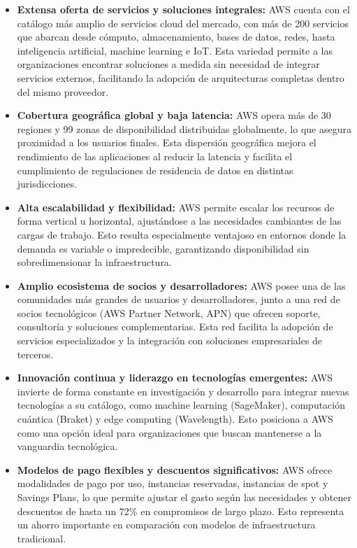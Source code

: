 {                \begin{itemize}
                    \item \textbf{Extensa oferta de servicios y soluciones integrales:} AWS cuenta con el catálogo más amplio de servicios cloud del mercado, con más de 200 servicios que abarcan desde cómputo, almacenamiento, bases de datos, redes, hasta inteligencia artificial, machine learning e IoT. Esta variedad permite a las organizaciones encontrar soluciones a medida sin necesidad de integrar servicios externos, facilitando la adopción de arquitecturas completas dentro del mismo proveedor.
                    \item \textbf{Cobertura geográfica global y baja latencia:} AWS opera más de 30 regiones y 99 zonas de disponibilidad distribuidas globalmente, lo que asegura proximidad a los usuarios finales. Esta dispersión geográfica mejora el rendimiento de las aplicaciones al reducir la latencia y facilita el cumplimiento de regulaciones de residencia de datos en distintas jurisdicciones.
                    \item \textbf{Alta escalabilidad y flexibilidad:} AWS permite escalar los recursos de forma vertical u horizontal, ajustándose a las necesidades cambiantes de las cargas de trabajo. Esto resulta especialmente ventajoso en entornos donde la demanda es variable o impredecible, garantizando disponibilidad sin sobredimensionar la infraestructura.
                    \item \textbf{Amplio ecosistema de socios y desarrolladores:} AWS posee una de las comunidades más grandes de usuarios y desarrolladores, junto a una red de socios tecnológicos (AWS Partner Network, APN) que ofrecen soporte, consultoría y soluciones complementarias. Esta red facilita la adopción de servicios especializados y la integración con soluciones empresariales de terceros.
                    \item \textbf{Innovación continua y liderazgo en tecnologías emergentes:} AWS invierte de forma constante en investigación y desarrollo para integrar nuevas tecnologías a su catálogo, como machine learning (SageMaker), computación cuántica (Braket) y edge computing (Wavelength). Esto posiciona a AWS como una opción ideal para organizaciones que buscan mantenerse a la vanguardia tecnológica.
                    \item \textbf{Modelos de pago flexibles y descuentos significativos:} AWS ofrece modalidades de pago por uso, instancias reservadas, instancias de spot y Savings Plans, lo que permite ajustar el gasto según las necesidades y obtener descuentos de hasta un 72\% en compromisos de largo plazo. Esto representa un ahorro importante en comparación con modelos de infraestructura tradicional.

\end{itemize}}

